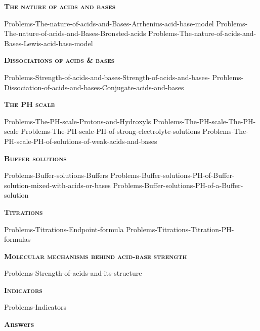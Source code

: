 \documentclass[main.tex]{subfiles}
\begin{document}
\newpage
 
\fancyhfoffset[E,O]{0pt}
\setlength{\columnsep}{30pt}
\begin{conclusion}
\end{conclusion}
\begin{multicols*}{2}\setcounter{numA}{1}
{\raggedright\textsc{\textbf{The nature of acids and bases}}\par}
 {Problems-The-nature-of-acids-and-Bases-Arrhenius-acid-base-model}
 {Problems-The-nature-of-acids-and-Bases-Bronsted-acids}
 {Problems-The-nature-of-acids-and-Bases-Lewis-acid-base-model}
{\raggedright\textsc{\textbf{Dissociations of acids \& bases}}\par}
 {Problems-Strength-of-acids-and-bases-Strength-of-acids-and-bases-}
 {Problems-Dissociation-of-acids-and-bases-Conjugate-acids-and-bases}
 
{\raggedright\textsc{\textbf{The PH scale}}\par}
 {Problems-The-PH-scale-Protons-and-Hydroxyls}
 {Problems-The-PH-scale-The-PH-scale}
 {Problems-The-PH-scale-PH-of-strong-electrolyte-solutions}
 {Problems-The-PH-scale-PH-of-solutions-of-weak-acids-and-bases}
			
{\raggedright\textsc{\textbf{Buffer solutions}}\par}
 {Problems-Buffer-solutions-Buffers}
 {Problems-Buffer-solutions-PH-of-Buffer-solution-mixed-with-acids-or-bases}
 {Problems-Buffer-solutions-PH-of-a-Buffer-solution}
{\raggedright\textsc{\textbf{Titrations}}\par}
 {Problems-Titrations-Endpoint-formula}
 {Problems-Titrations-Titration-PH-formulas}
 {\raggedright\textsc{\textbf{Molecular mechanisms behind acid-base strength}}\par}
 {Problems-Strength-of-acids-and-its-structure}
 {\raggedright\textsc{\textbf{Indicators}}\par}
 {Problems-Indicators}
\end{multicols*}
\newpage
\begin{answersenvironment}
\begin{minipage}[c]{1\textwidth}
\begin{localsize}{10}
{\Large \bf Answers}
  \printsolutions[byID={1,3,5,7,9,11,13,15,17,19,21,23,25,27,29,31,33,35,37, 39, 41, 43, 45}]
\end{localsize}
\end{minipage}\end{answersenvironment}
\end{document}

